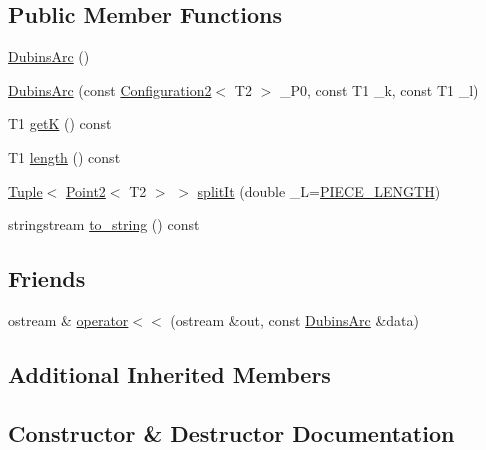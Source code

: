 \subsection*{Public Member Functions}
\begin{DoxyCompactItemize}
\item 
\mbox{\hyperlink{class_dubins_arc_ad09a4671b1b63f630d01b10ef3e48fb0}{Dubins\+Arc}} ()
\item 
\mbox{\hyperlink{class_dubins_arc_a213b0e587638328be1e448869e351475}{Dubins\+Arc}} (const \mbox{\hyperlink{class_configuration2}{Configuration2}}$<$ T2 $>$ \+\_\+\+P0, const T1 \+\_\+k, const T1 \+\_\+l)
\item 
T1 \mbox{\hyperlink{class_dubins_arc_af3fefdb90ba414db3560ef12b329f54a}{getK}} () const
\item 
T1 \mbox{\hyperlink{class_dubins_arc_a1b0bfacb344d17377f4bda55fdaecae4}{length}} () const
\item 
\mbox{\hyperlink{class_tuple}{Tuple}}$<$ \mbox{\hyperlink{class_point2}{Point2}}$<$ T2 $>$ $>$ \mbox{\hyperlink{class_dubins_arc_a346c19e3e9f25747e3e3ae9de997e09d}{split\+It}} (double \+\_\+L=\mbox{\hyperlink{dubins_8hh_a5b2500ca93a5100f73dc442d3cfea7d4}{P\+I\+E\+C\+E\+\_\+\+L\+E\+N\+G\+TH}})
\item 
stringstream \mbox{\hyperlink{class_dubins_arc_aa90c32f88f048e4e17ea79489f44dbfb}{to\+\_\+string}} () const
\end{DoxyCompactItemize}
\subsection*{Friends}
\begin{DoxyCompactItemize}
\item 
ostream \& \mbox{\hyperlink{class_dubins_arc_a9fbd2f7583b614eba51fd90a9def4b51}{operator$<$$<$}} (ostream \&out, const \mbox{\hyperlink{class_dubins_arc}{Dubins\+Arc}} \&data)
\end{DoxyCompactItemize}
\subsection*{Additional Inherited Members}


\subsection{Constructor \& Destructor Documentation}
\mbox{\label{class_dubins_arc_ad09a4671b1b63f630d01b10ef3e48fb0}} 
